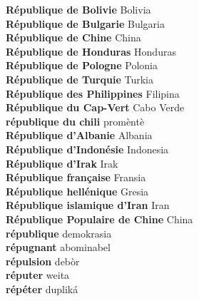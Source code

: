 \textbf{ République de Bolivie  } Bolivia \\
\textbf{ République de Bulgarie  } Bulgaria \\
\textbf{ République de Chine  } China \\
\textbf{ République de Honduras  } Honduras \\
\textbf{ République de Pologne  } Polonia \\
\textbf{ République de Turquie  } Turkia \\
\textbf{ République des Philippines  } Filipina \\
\textbf{ République du Cap-Vert  } Cabo Verde \\
\textbf{ république du chili  } promèntè \\
\textbf{ République d’Albanie  } Albania \\
\textbf{ République d’Indonésie  } Indonesia \\
\textbf{ République d’Irak  } Irak \\
\textbf{ République française  } Fransia \\
\textbf{ République hellénique  } Gresia \\
\textbf{ République islamique d’Iran  } Iran \\
\textbf{ République Populaire de Chine  } China \\
\textbf{ république  } demokrasia \\
\textbf{ répugnant  } abominabel \\
\textbf{ répulsion  } debòr \\
\textbf{ réputer  } weita \\
\textbf{ répéter  } dupliká \\
